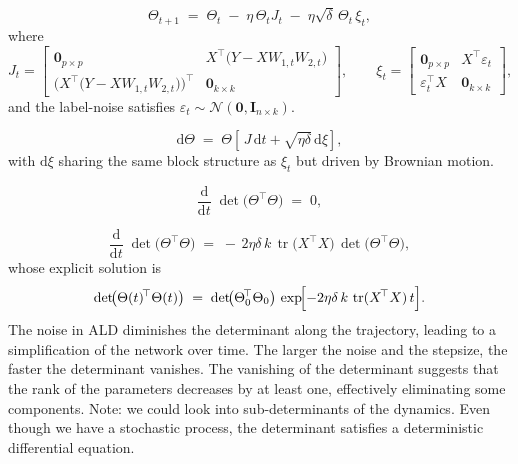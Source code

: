 \documentclass[11pt]{article}
\begin{document}
\begin{equation}\label{eq:lsgd}
    \Theta_{t+1}
    \;=\;
    \Theta_t
    \;-\;
    \eta\,\Theta_t J_t
    \;-\;
    \eta\sqrt{\delta}\,\Theta_t \,\xi_t ,
\end{equation}
%
where
\[
    J_t=
    \begin{bmatrix}
        \mathbf{0}_{p\times p} & X^{\!\top}\!\bigl(Y-XW_{1,t}W_{2,t}\bigr) \\
        \bigl(X^{\!\top}\!\bigl(Y-XW_{1,t}W_{2,t}\bigr)\bigr)^{\!\top} & \mathbf{0}_{k\times k}
    \end{bmatrix},
    \qquad
    \xi_t=
    \begin{bmatrix}
        \mathbf{0}_{p\times p} & X^{\!\top}\varepsilon_t \\
        \varepsilon_t^{\!\top}X & \mathbf{0}_{k\times k}
    \end{bmatrix},
\]
and the label-noise satisfies $\varepsilon_t\sim\mathcal N(\mathbf 0,\mathbf I_{n\times k})$.

\begin{equation}\label{eq:sgf}
    \mathrm d\Theta
    \;=\;
    \Theta\!\left[\,J\,\mathrm dt
                  +\sqrt{\eta\delta}\,\mathrm d\xi\right],
\end{equation}
with $\mathrm d\xi$ sharing the same block structure as $\xi_t$ but driven by Brownian motion.

\begin{equation}\label{eq:gd-det}
    \frac{\mathrm d}{\mathrm dt}\;
    \det\!\bigl(\Theta^{\!\top}\Theta\bigr)
    \;=\;0,
\end{equation}

\begin{equation}\label{eq:sgd-det}
    \frac{\mathrm d}{\mathrm dt}\;
    \det\!\bigl(\Theta^{\!\top}\Theta\bigr)
    \;=\;
    -\,2\eta\delta\,k\,\operatorname{tr}\!\bigl(X^{\!\top}X\bigr)\,
      \det\!\bigl(\Theta^{\!\top}\Theta\bigr),
\end{equation}
whose explicit solution is
\[
    \det\!\bigl(\Theta(t)^{\!\top}\Theta(t)\bigr)
    \;=\;
    \det\!\bigl(\Theta_0^{\!\top}\Theta_0\bigr)\,
    \exp\!\Bigl[-2\eta\delta\,k\,\operatorname{tr}(X^{\!\top}X)\,t\Bigr].
\]
The noise in ALD diminishes the determinant along the trajectory, leading to a simplification of the network over time. The larger
the noise and the stepsize, the faster the determinant vanishes. The vanishing of the determinant
suggests that the rank of the parameters decreases by at least one, effectively eliminating some
components. Note: we could look into sub-determinants of the dynamics. Even though we have a stochastic process, the determinant satisfies a deterministic differential equation.
\end{document}
